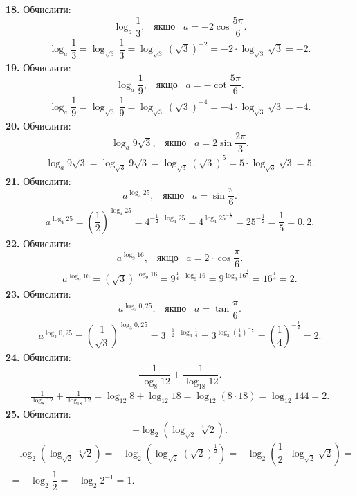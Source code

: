 \textbf{18.} Обчислити:
$$
\log_{a}\dfrac{1}{3}, \;\;\; \mbox{якщо} \;\;\; a=-2\cos\dfrac{5\pi}{6}.
$$
\begin{gather*}
\log_{a}\dfrac{1}{3}=
\log_{\sqrt{3}}\dfrac{1}{3}=
\log_{\sqrt{3}}\left(\sqrt{3}\right)^{-2}=
-2\cdot\log_{\sqrt{3}}\sqrt{3}=-2.
\end{gather*}
\textbf{19.} Обчислити:
$$
\log_{a}\dfrac{1}{9}, \;\;\; \mbox{якщо} \;\;\; a=-\cot\dfrac{5\pi}{6}.
$$
\begin{gather*}
\log_{a}\dfrac{1}{9}=
\log_{\sqrt{3}}\dfrac{1}{9}=
\log_{\sqrt{3}}\left(\sqrt{3}\right)^{-4}=
-4\cdot\log_{\sqrt{3}}\sqrt{3}=-4.
\end{gather*}
\textbf{20.} Обчислити:
$$
\log_{a}9\sqrt{3}, \;\;\; \mbox{якщо} \;\;\; a=2\sin\dfrac{2\pi}{3}.
$$
\begin{gather*}
\log_{a}9\sqrt{3}=
\log_{\sqrt{3}}9\sqrt{3}=
\log_{\sqrt{3}}\left(\sqrt{3}\right)^5=
5\cdot\log_{\sqrt{3}}\sqrt{3}=5.
\end{gather*}
\textbf{21.} Обчислити:
$$
a^{\log_{4}25}, \;\;\; \mbox{якщо} \;\;\; a=\sin\dfrac{\pi}{6}.
$$
\begin{gather*}
a^{\log_{4}25}=
\left(\dfrac{1}{2}\right)^{\log_{4}25}=
4^{-\frac{1}{2}\cdot\log_{4}25}=
4^{\log_{4}25^{-\frac{1}{2}}}=
25^{-\frac{1}{2}}=\dfrac{1}{5}=0,2.
\end{gather*}
\textbf{22.} Обчислити:
$$
a^{\log_{9}16}, \;\;\; \mbox{якщо} \;\;\; a=2\cdot\cos\dfrac{\pi}{6}.
$$
\begin{gather*}
a^{\log_{9}16}=
\left(\sqrt{3}\right)^{\log_{9}16}=
9^{\frac{1}{4}\cdot\log_{9}16}=
9^{\log_{9}16^{\frac{1}{4}}}=
16^{\frac{1}{4}}=2.
\end{gather*}
\textbf{23.} Обчислити:
$$
a^{\log_{3}0,25}, \;\;\; \mbox{якщо} \;\;\; a=\tan\dfrac{\pi}{6}.
$$
\begin{gather*}
a^{\log_{3}0,25}=
\left(\dfrac{1}{\sqrt{3}}\right)^{\log_{3}0,25}=
3^{-\frac{1}{2}\cdot\log_{3}\frac{1}{4}}=
3^{\log_{3}\left(\frac{1}{4}\right)^{-\frac{1}{2}}}=
\left(\dfrac{1}{4}\right)^{-\frac{1}{2}}=2.
\end{gather*}
\textbf{24.} Обчислити:
$$
\frac{1}{\log_{8}12}+\frac{1}{\log_{18}12}.
$$
\begin{gather*}
\frac{1}{\log_{8}12}+\frac{1}{\log_{18}12}=
\log_{12}8+\log_{12}18=
\log_{12}(8\cdot18)=
\log_{12}144=2.
\end{gather*}
\textbf{25.} Обчислити:
$$
-\log_{2}\left(\log_{\sqrt{2}}\sqrt[4]{2}\right).
$$
\begin{multline*}
-\log_{2}\left(\log_{\sqrt{2}}\sqrt[4]{2}\right)=
-\log_{2}\left(\log_{\sqrt{2}}\left(\sqrt{2}\right)^{\frac{1}{2}}\right)=
-\log_{2}\left(\dfrac{1}{2}\cdot\log_{\sqrt{2}}\sqrt{2}\right)=\\
=-\log_{2}\dfrac{1}{2}=-\log_{2}2^{-1}=1.
\end{multline*}
